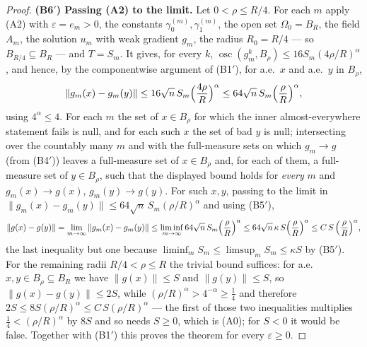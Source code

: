 \begin{proof}
\textbf{(B6$'$) Passing (A2) to the limit.}  Let
$0<\rho\le R/4$.  For each $m$ apply (A2) with
$\varepsilon=e_m>0$, the constants $\gamma_0^{(m)},\gamma_1^{(m)}$, the open set
$\Omega_0=B_R$, the field $A_m$, the solution $u_m$ with weak gradient $g_m$,
the radius $R_0=R/4$ --- so $B_{R/4}\subseteq B_R$ --- and $T=S_m$.  It gives,
for every $k$, $\operatorname*{osc}(g_m^k,B_\rho)\le16S_m(4\rho/R)^{\alpha}$,
and hence, by the componentwise argument of (B1$'$), for a.e.\ $x$ and a.e.\
$y$ in $B_\rho$,
\[
\|g_m(x)-g_m(y)\|\le16\sqrt n\,S_m\Bigl(\frac{4\rho}R\Bigr)^{\alpha}
\le64\sqrt n\,S_m\Bigl(\frac\rho R\Bigr)^{\alpha},
\]
using $4^{\alpha}\le4$.  For each $m$ the set of $x\in B_\rho$ for which the
inner almost-everywhere statement fails is null, and for each such $x$ the set of
bad $y$ is null; intersecting over the countably many $m$ and with the
full-measure sets on which $g_m\to g$ (from (B4$'$)) leaves a full-measure set of
$x\in B_\rho$ and, for each of them, a full-measure set of $y\in B_\rho$, such
that the displayed bound holds for \emph{every} $m$ and $g_m(x)\to g(x)$,
$g_m(y)\to g(y)$.  For such $x,y$, passing to the limit in
$\|g_m(x)-g_m(y)\|\le64\sqrt n\,S_m(\rho/R)^{\alpha}$ and using (B5$'$),
\[
\|g(x)-g(y)\|=\lim_{m\to\infty}\|g_m(x)-g_m(y)\|
\le\liminf_{m\to\infty}64\sqrt n\,S_m\Bigl(\frac\rho R\Bigr)^{\alpha}
\le64\sqrt n\,\kappa\,S\Bigl(\frac\rho R\Bigr)^{\alpha}
\le C\,S\,\Bigl(\frac\rho R\Bigr)^{\alpha},
\]
the last inequality but one because
$\liminf_mS_m\le\limsup_mS_m\le\kappa S$ by (B5$'$).  For the remaining radii
$R/4<\rho\le R$ the trivial bound suffices: for a.e.\
$x,y\in B_\rho\subseteq B_R$ we have $\|g(x)\|\le S$ and $\|g(y)\|\le S$, so
$\|g(x)-g(y)\|\le2S$, while $(\rho/R)^{\alpha}>4^{-\alpha}\ge\tfrac14$ and
therefore $2S\le8S(\rho/R)^{\alpha}\le C\,S(\rho/R)^{\alpha}$ --- the first of
those two inequalities multiplies $\tfrac14<(\rho/R)^{\alpha}$ by $8S$ and so
needs $S\ge0$, which is (A0); for $S<0$ it would be false.  Together with
(B1$'$) this proves the theorem for every $\varepsilon\ge0$.
\end{proof}
